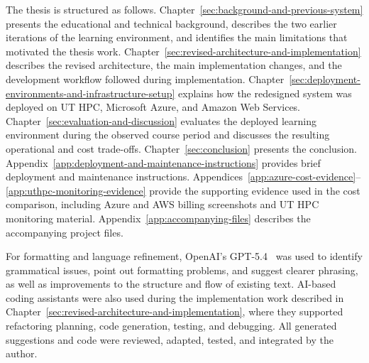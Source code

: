 The thesis is structured as follows.
Chapter~\ref{sec:background-and-previous-system} presents the educational and technical background, describes the two earlier iterations of the learning environment, and identifies the main limitations that motivated the thesis work.
Chapter~\ref{sec:revised-architecture-and-implementation} describes the revised architecture, the main implementation changes, and the development workflow followed during implementation.
Chapter~\ref{sec:deployment-environments-and-infrastructure-setup} explains how the redesigned system was deployed on UT HPC, Microsoft Azure, and Amazon Web Services.
Chapter~\ref{sec:evaluation-and-discussion} evaluates the deployed learning environment during the observed course period and discusses the resulting operational and cost trade-offs.
Chapter~\ref{sec:conclusion} presents the conclusion.
Appendix~\ref{app:deployment-and-maintenance-instructions} provides brief deployment and maintenance instructions.
Appendices~\ref{app:azure-cost-evidence}--\ref{app:uthpc-monitoring-evidence} provide the supporting evidence used in the cost comparison, including Azure and AWS billing screenshots and UT HPC monitoring material.
Appendix~\ref{app:accompanying-files} describes the accompanying project files.

For formatting and language refinement, OpenAI's GPT-5.4~\cite{openai_gpt_5_4_2026} was used to identify grammatical issues, point out formatting problems, and suggest clearer phrasing, as well as improvements to the structure and flow of existing text.
AI-based coding assistants were also used during the implementation work described in Chapter~\ref{sec:revised-architecture-and-implementation}, where they supported refactoring planning, code generation, testing, and debugging.
All generated suggestions and code were reviewed, adapted, tested, and integrated by the author.
